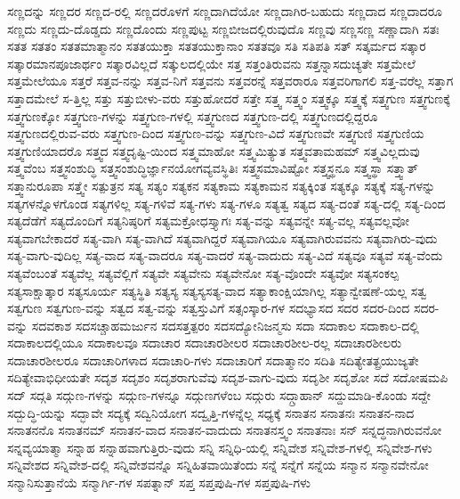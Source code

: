 {ಸಣ್ಣದನ್ನು
ಸಣ್ಣದರ
ಸಣ್ಣದ-ರಲ್ಲಿ
ಸಣ್ಣದರೊಳಗೆ
ಸಣ್ಣದಾಗಿದೆಯೋ
ಸಣ್ಣದಾಗಿರ-ಬಹುದು
ಸಣ್ಣದಾದ
ಸಣ್ಣದಾದರೂ
ಸಣ್ಣದು
ಸಣ್ಣದು-ದೊಡ್ಡದು
ಸಣ್ಣದೊಂದು
ಸಣ್ಣಪುಟ್ಟ
ಸಣ್ಣಬೀಜದಲ್ಲಿರುವುದೊ
ಸಣ್ಣವು
ಸಣ್ಣಸಣ್ಣ
ಸಣ್ಣಾದಾಗಿ
ಸತಃ
ಸತತ
ಸತತಂ
ಸತತಮಾತ್ಮಾನಂ
ಸತತಯುಕ್ತಾ
ಸತತಯುಕ್ತಾನಾಂ
ಸತತವೂ
ಸತಿ
ಸತಿಪತಿ
ಸತ್
ಸತ್ಕರ್ಮದ
ಸತ್ಕಾರ
ಸತ್ಕಾರಮಾನಪೂಜಾರ್ಥಂ
ಸತ್ಕಾರವಿಲ್ಲದೆ
ಸತ್ಕುಲದಲ್ಲಿಯೇ
ಸತ್ತ
ಸತ್ತಂತಿರುವನು
ಸತ್ತನ್ನಾಸದುಚ್ಯತೇ
ಸತ್ತಮೇಲೆ
ಸತ್ತಮೇಲೆಯೂ
ಸತ್ತರೆ
ಸತ್ತವ-ನನ್ನು
ಸತ್ತವ-ನಿಗೆ
ಸತ್ತವನು
ಸತ್ತವರನ್ನೆ
ಸತ್ತವರಾರೂ
ಸತ್ತವರಿಗಾಗಲಿ
ಸತ್ತ-ವರೆಲ್ಲ
ಸತ್ತಾಗ
ಸತ್ತಾದಮೇಲೆ
ಸ-ತ್ತಿಲ್ಲ
ಸತ್ತು
ಸತ್ತುಬೀಳು-ವರು
ಸತ್ತುಹೋದರೆ
ಸತ್ತೇ
ಸತ್ತ್ವ
ಸತ್ತ್ವಂ
ಸತ್ತ್ವಕ್ಕೂ
ಸತ್ತ್ವಕ್ಕೆ
ಸತ್ತ್ವಗುಣ
ಸತ್ತ್ವಗುಣಕ್ಕೆ
ಸತ್ತ್ವಗುಣಕ್ಕೋ
ಸತ್ತ್ವಗುಣ-ಗಳನ್ನು
ಸತ್ತ್ವಗುಣ-ಗಳಲ್ಲಿ
ಸತ್ತ್ವಗುಣದ
ಸತ್ತ್ವಗುಣ-ದಲ್ಲಿ
ಸತ್ತ್ವಗುಣದಲ್ಲಿದ್ದರೂ
ಸತ್ತ್ವಗುಣದಲ್ಲಿರುವ-ವರು
ಸತ್ತ್ವಗುಣ-ದಿಂದ
ಸತ್ತ್ವಗುಣ-ವನ್ನು
ಸತ್ತ್ವಗುಣ-ವಿದೆ
ಸತ್ತ್ವಗುಣವೇ
ಸತ್ತ್ವಗುಣಿ
ಸತ್ತ್ವಗುಣಿಯ
ಸತ್ತ್ವಗುಣಿಯಾದರೊ
ಸತ್ತ್ವದ
ಸತ್ತ್ವದೃಷ್ಟಿ-ಯಿಂದ
ಸತ್ತ್ವಮಾಹೋ
ಸತ್ತ್ವಮಿತ್ಯುತ
ಸತ್ತ್ವವತಾಮಹಮ್
ಸತ್ತ್ವವಿಲ್ಲದುವು
ಸತ್ತ್ವವೆಂಬ
ಸತ್ತ್ವಸಂಶುದ್ಧಿ
ಸತ್ತ್ವಸಂಶುದ್ಧಿರ್ಜ್ಞಾನಯೋಗವ್ಯವಸ್ಥಿತಿಃ
ಸತ್ತ್ವಸಮಾವಿಷ್ಟೋ
ಸತ್ತ್ವಸ್ಥನೂ
ಸತ್ತ್ವಸ್ಥಾ
ಸತ್ತ್ವಾತ್
ಸತ್ತ್ವಾನುರೂಪಾ
ಸತ್ತ್ವೇ
ಸತ್ಪುತ್ರನ
ಸತ್ಯ
ಸತ್ಯಂ
ಸತ್ಯಕನ
ಸತ್ಯಕಾಮ
ಸತ್ಯಕಾಮನ
ಸತ್ಯಕ್ಕಿಂತ
ಸತ್ಯಕ್ಕೂ
ಸತ್ಯಕ್ಕೆ
ಸತ್ಯ-ಗಳನ್ನು
ಸತ್ಯಗಳನ್ನೊಳಗೊಂಡ
ಸತ್ಯಗಳಿಲ್ಲ
ಸತ್ಯ-ಗಳಿವೆ
ಸತ್ಯ-ಗಳು
ಸತ್ಯ-ಗಳೂ
ಸತ್ಯತ್ವ
ಸತ್ಯದ
ಸತ್ಯ-ದಂತೆ
ಸತ್ಯ-ದಲ್ಲಿ
ಸತ್ಯ-ದಿಂದ
ಸತ್ಯದೆಡೆಗೆ
ಸತ್ಯದೊಂದಿಗೆ
ಸತ್ಯನಿಷ್ಠರಿಗೆ
ಸತ್ಯಮಕ್ರೋಧಸ್ತ್ಯಾಗಃ
ಸತ್ಯ-ವನ್ನು
ಸತ್ಯವನ್ನೇ
ಸತ್ಯ-ವಲ್ಲ
ಸತ್ಯವಲ್ಲವೋ
ಸತ್ಯವಾಗಬೇಕಾದರೆ
ಸತ್ಯ-ವಾಗಿ
ಸತ್ಯ-ವಾಗಿದೆ
ಸತ್ಯವಾಗಿದ್ದರೆ
ಸತ್ಯವಾಗಿಯೂ
ಸತ್ಯವಾಗಿರುವವನು
ಸತ್ಯವಾಗಿರು-ವುದು
ಸತ್ಯ-ವಾಗು-ವುದಿಲ್ಲ
ಸತ್ಯ-ವಾದ
ಸತ್ಯ-ವಾದರೂ
ಸತ್ಯ-ವಾದರೆ
ಸತ್ಯ-ವಾದುದು
ಸತ್ಯ-ವಿದೆ
ಸತ್ಯವೂ
ಸತ್ಯವೆ
ಸತ್ಯ-ವೆಂದು
ಸತ್ಯವೆಂಬಂತೆ
ಸತ್ಯವೆಲ್ಲ
ಸತ್ಯವೆಲ್ಲಿಗೆ
ಸತ್ಯವೇ
ಸತ್ಯವೇನು
ಸತ್ಯವೇನೋ
ಸತ್ಯ-ವೊಂದೇ
ಸತ್ಯವೋ
ಸತ್ಯಸಂಕಲ್ಪ
ಸತ್ಯಸಾಕ್ಷಾತ್ಕಾರ
ಸತ್ಯಸೂರ್ಯ
ಸತ್ಯಸ್ಥಿತಿ
ಸತ್ಯಸ್ಯ
ಸತ್ಯಸ್ಯಸತ್ಯ-ವಾದ
ಸತ್ಯಾಕಾಂಕ್ಷಿಯಾಗಿಲ್ಲ
ಸತ್ಯಾನ್ವೇಷಣೆ-ಯಲ್ಲ
ಸತ್ವ
ಸತ್ವಗುಣ
ಸತ್ವಗುಣ-ವನ್ನು
ಸತ್ವದ
ಸತ್ವ-ವನ್ನು
ಸತ್ವಸ್ತುವಿಗೆ
ಸತ್ಸಂಸ್ಕಾರ-ಗಳ
ಸದಭ್ಯಾಸದ
ಸದರ
ಸದರ-ದಿಂದ
ಸದರ-ವನ್ನು
ಸದವಕಾಶ
ಸದಸಚ್ಚಾಹಮರ್ಜುನ
ಸದಸತ್ತತ್ಪರಂ
ಸದಸದ್ಯೋನಿಜನ್ಮಸು
ಸದಾ
ಸದಾಕಾಲ
ಸದಾಕಾಲ-ದಲ್ಲಿ
ಸದಾಕಾಲದಲ್ಲಿಯೂ
ಸದಾಕಾಲವೂ
ಸದಾಚಾರ
ಸದಾಚಾರಶೀಲರ
ಸದಾಚಾರಶೀಲ-ರಲ್ಲ
ಸದಾಚಾರಶೀಲರು
ಸದಾಚಾರಶೀಲರೂ
ಸದಾಚಾರಿಗಳಾದ
ಸದಾಚಾರಿ-ಗಳು
ಸದಾಚಾರಿಗೆ
ಸದಾತ್ಮಾನಂ
ಸದಿತಿ
ಸದಿತ್ಯೇತತ್ಪ್ರಯುಜ್ಯತೇ
ಸದಿತ್ಯೇವಾಭಿಧೀಯತೇ
ಸದೃಶ
ಸದೃಶಂ
ಸದೃಶರಾಗುವೆವು
ಸದೃಶ-ವಾಗು-ವುದು
ಸದೃಶೀ
ಸದೃಶೋ
ಸದೆ
ಸದೋಷಮಪಿ
ಸದ್
ಸದ್ಗತಿ
ಸದ್ಗುಣ-ಗಳನ್ನು
ಸದ್ಗುಣ-ಗಳನ್ನೂ
ಸದ್ಗುಣಗಳೆಂಬ
ಸದ್ಗುರು
ಸದ್ಗ್ರಾಹಾನ್
ಸದ್ದುಮಾಡಿ-ಕೊಂಡು
ಸದ್ದೇ
ಸದ್ಬುದ್ಧಿ-ಯನ್ನು
ಸದ್ಭಾವೇ
ಸದ್ಯಕ್ಕೆ
ಸದ್ವಿನಿಯೋಗ
ಸದ್ವೃತ್ತಿ-ಗಳನ್ನೆಲ್ಲ
ಸಧ್ಯಕ್ಕೆ
ಸನಾತನ
ಸನಾತನಃ
ಸನಾತನ-ನಾದ
ಸನಾತನನೊ
ಸನಾತನಮ್
ಸನಾತನ-ವಾದ
ಸನಾತನ-ವಾದುದು
ಸನಾತನಸ್ತ್ವಂ
ಸನಾತನಾಃ
ಸನ್
ಸನ್ನದ್ಧನಾಗಿರುವನೋ
ಸನ್ನವ್ಯಯಾತ್ಮಾ
ಸನ್ನಾಹ
ಸನ್ನಾಹವಾಗುತ್ತಿರು-ವುದು
ಸನ್ನಿ
ಸನ್ನಿಧಿ-ಯಲ್ಲಿ
ಸನ್ನಿವೇಶ
ಸನ್ನಿವೇಶ-ಗಳಲ್ಲಿ
ಸನ್ನಿವೇಶ-ಗಳು
ಸನ್ನಿವೇಶದ
ಸನ್ನಿವೇಶ-ದಲ್ಲಿ
ಸನ್ನಿವೇಶವನ್ನೊ
ಸನ್ನಿಹಿತವಾಯಿತೆಂದು
ಸನ್ನೆ
ಸನ್ನೆಗೆ
ಸನ್ನೆಯ
ಸನ್ಮಾನ
ಸನ್ಮಾನವೇನೋ
ಸನ್ಮಾನಿಸುತ್ತಾನೆಯೆ
ಸನ್ಮಾರ್ಗಿ-ಗಳ
ಸಪತ್ನಾನ್
ಸಪ್ತ
ಸಪ್ತಪುಷಿ-ಗಳ
ಸಪ್ತಪುಷಿ-ಗಳು
}
